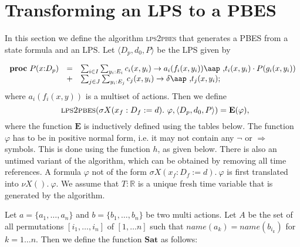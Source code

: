 \documentclass{article}
\begin{document}
\section{Transforming an LPS to a PBES}

In this section we define the algorithm \textsc{lps2pbes} that generates a
PBES from a state formula and an LPS. Let $\langle {D_{p},d_{0},P}\rangle $
be the LPS given by

\begin{equation*}
\begin{array}{lrl}
\mathbf{proc}~P(x{:}D_{p}) & = & \sum_{i\in
I}\sum_{y_{i}:E_{i}}c_{i}(x,y_{i})\rightarrow a_{i}(f_{i}(x,y_{i}))%
\mbox{\aap ,}t_{i}(x,y_{i})\cdot P(g_{i}(x,y_{i})) \\ 
& + & \sum_{j\in J}\sum_{y_{i}:E_{j}}c_{j}(x,y_{i})\rightarrow \delta %
\mbox{\aap ,}t_{j}(x,y_{i});%
\end{array}%
\end{equation*}%
where $a_{i}(f_{i}(x,y))$ is a multiset of actions. Then we define 
\begin{equation*}
\text{\textsc{lps2pbes}}(\sigma X(x_{f}:D_{f}:=d).~\varphi ,\langle {%
D_{p},d_{0},P}\rangle )=\mathbf{E}(\varphi ),
\end{equation*}%
where the function $\mathbf{E}$ is inductively defined using the tables
below. The function $\varphi $ has to be in positive normal form, i.e. it
may not contain any $\lnot $ or $\Rightarrow $ symbols. This is done using
the function $h$, as given below. There is also an untimed variant of the
algorithm, which can be obtained by removing all time references. A formula $%
\varphi $ not of the form $\sigma X(x_{f}:D_{f}:=d).~\varphi $ is first
translated into $\nu X().~\varphi $. We assume that $T:\mathbb{R}$ is a
unique fresh time variable that is generated by the algorithm.

\vspace{1cm}

Let $a=\{a_{1},\ldots ,a_{n}\}$ and $b=\{b_{1},\ldots ,b_{n}\}$ be two multi
actions. Let $A$ be the set of all permutations $[i_{1},\ldots ,i_{n}]$ of $%
[1,\ldots n]$ such that $name(a_{k})=name(b_{i_{k}})$ for $k=1\ldots n$.
Then we define the function $\mathbf{Sat}$ as follows:
\end{document}
